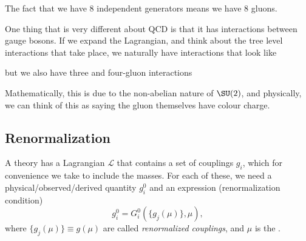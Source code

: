 \documentclass[a4paper]{article}
\begin{document}
The fact that we have 8 independent generators means we have 8 gluons.

One thing that is very different about QCD is that it has interactions between gauge bosons. If we expand the Lagrangian, and think about the tree level interactions that take place, we naturally have interactions that look like
\begin{center}
\end{center}
but we also have three and four-gluon interactions
\begin{center}
  \quad
\end{center}
Mathematically, this is due to the non-abelian nature of $\SU(2)$, and physically, we can think of this as saying the gluon themselves have colour charge.

\subsection{Renormalization}
A theory has a Lagrangian $\mathcal{L}$ that contains a set of couplings $g_i$, which for convenience we take to include the masses. For each of these, we need a physical/observed/derived quantity $g_i^0$ and an expression (renormalization condition)
\[
  g_i^0 = G_i^0 (\{g_j(\mu)\}, \mu),
\]
where $\{g_j(\mu)\} \equiv g(\mu)$ are called \emph{renormalized couplings}, and $\mu$ is the .
\end{document}
